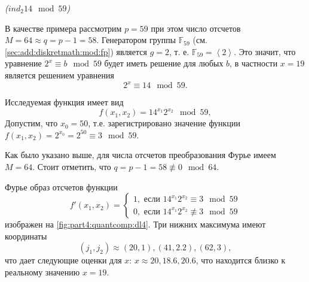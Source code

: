 \begin{example}
\emph{($ind_2{14} \mod{59}$)}

В качестве примера рассмотрим $p = 59$ при этом число отсчетов $M = 64
\approx q = p - 1 = 58$. Генератором группы $\mathbb{F}_{59}$ (см.
\autoref{sec:add:diskretmath:mod:fp}) 
является $g = 2$, т. е. $\mathbb{F}_{59} = \left<2\right>$. Это
значит, что уравнение $2^x \equiv b \mod 59$ будет иметь решение для
любых $b$, в частности $x = 19$ является решением уравнения
\[
2^x \equiv 14 \mod 59.
\] 

Исследуемая функция имеет вид
\[
f(x_1, x_2) = 14^{x_1} 2^{x_2} \mod 59,
\]
Допустим, что $x_0 = 50$, т.е. зарегистрировано значение функции
$f(x_1, x_2) = 2^{x_0} = 2^{50} \equiv 3 \mod 59$.



Как было указано выше, для числа отсчетов преобразования Фурье имеем $M=64$. Стоит отметить,
что $q = p - 1 = 58 \not\equiv 0 \mod 64$.

Фурье образ отсчетов функции 
\[
f'(x_1, x_2) = 
\begin{cases}
1, \mbox{ если } 14^{x_1} 2^{x_2} \equiv 3 \mod 59 \\
0, \mbox{ если } 14^{x_1} 2^{x_2} \not\equiv 3 \mod 59 
\end{cases}
\]
изображен на \autoref{fig:part4:quantcomp:dl4}. 
Три нижних максимума имеют координаты 
\[
(j_1, j_2) \approx (20,1), (41,2.2), (62,3), 
\]
что дает следующие оценки для $x$: $x \approx 20, 18.6, 20.6$,
что находится близко к реальному значению $x = 19$.
\label{ex:part4:quantcomp:discretlog:periodfinding3}
\end{example}




